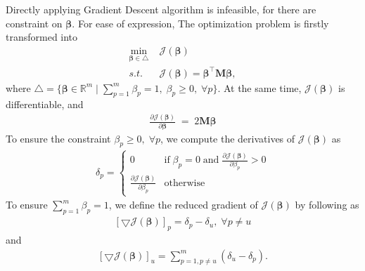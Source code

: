 \documentclass{article}
\begin{document}
Directly applying Gradient Descent algorithm is infeasible, for there are constraint on $\boldsymbol{\beta}$.
For ease of expression, The optimization problem is firstly transformed into 
\begin{equation}\label{eq:obj_tran_two}
	\begin{split}
		\min_{\boldsymbol{\beta}\in \bigtriangleup} &\; \mathcal{J}(\boldsymbol{\beta}) \\
		s.t. & \; \mathcal{J}(\boldsymbol{\beta}) = \boldsymbol{\beta}^\top\mathbf{M}\boldsymbol{\beta},
	\end{split}
\end{equation}
where $\bigtriangleup = \{ \boldsymbol{\beta} \in \mathbb{R}^m\; |\; \sum_{p=1}^m \beta_p = 1,\; \beta_p\geq 0,\; \forall p\}$.
At the same time, $\mathcal{J}(\boldsymbol{\beta})$ is differentiable, and
\begin{equation}\label{eq:obj_derivative_two}
	\begin{split}
		\frac{\partial \mathcal{J}(\boldsymbol{\beta})}{\partial \boldsymbol{\beta}}\; =\; 2\mathbf{M}\boldsymbol{\beta}
	\end{split}
\end{equation}
To ensure the constraint $\beta_p \geq 0,\; \forall p$, we compute the derivatives of $\mathcal{J}(\boldsymbol{\beta})$ as 
\begin{equation}
	\begin{split}
		\delta_p = \left\{
			\begin{array}{ll}
			0	&	\mathrm{if}\; \beta_p=0\; \mathrm{and}\; \frac{\partial \mathcal{J}(\boldsymbol{\beta})}{\partial \beta_p} > 0\\
			\frac{\partial \mathcal{J}(\boldsymbol{\beta})}{\partial \beta_p}  &  \mathrm{otherwise}
			\end{array} \right.
	\end{split}
\end{equation}
To ensure $\sum_{p=1}^m \beta_p = 1$, we define the reduced gradient of $\mathcal{J}(\boldsymbol{\beta})$ by following \cite{rakotomamonjy2008simplemkl} as 
\begin{equation}\label{eq:p_derivative_two}
	\begin{split}
		[\bigtriangledown \mathcal{J}(\boldsymbol{\beta})]_p = \delta_p - \delta_u,\; \forall p \neq u
	\end{split}
\end{equation}
and 
\begin{equation}\label{eq:u_derivative_two}
	\begin{split}
		[\bigtriangledown \mathcal{J}(\boldsymbol{\beta})]_u = \sum_{p=1,p\neq u}^m (\delta_u - \delta_p).
	\end{split}
\end{equation}
\end{document}
